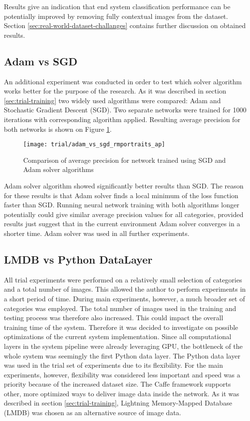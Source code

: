    Results give an indication that end system classification performance can be potentially improved by removing fully contextual images from the dataset. Section \ref{sec:real-world-dataset-challanges} contains further discussion on obtained results.

    
\subsection{Adam vs SGD}
    An additional experiment was conducted in order to test which solver algorithm works better for the purpose of the research. As it was described in section \ref{sec:trial-training} two widely used algorithms were compared: Adam and Stochastic Gradient Descent (SGD). Two separate networks were trained for 1000 iterations with corresponding algorithm applied. Resulting average precision for both networks is shown on Figure \ref{fig:trial-sgd-vs-adam}.

    \begin{figure}[H]
        \centering
        \texttt{[image: trial/adam\_vs\_sgd\_rmportraits\_ap]}
        \caption{Comparison of average precision for network trained using SGD and Adam solver algorithms}
        \label{fig:trial-sgd-vs-adam}
    \end{figure}
    
    Adam solver algorithm showed significantly better results than SGD. The reason for these results is that Adam solver finds a local minimum of the loss function faster than SGD. Running neural network training with both algorithms longer potentially could give similar average precision values for all categories, provided results just suggest that in the current environment Adam solver converges in a shorter time. Adam solver was used in all further experiments.
    
    
\subsection{LMDB vs Python DataLayer}
    All trial experiments were performed on a relatively small selection of categories and a total number of images. This allowed the author to perform experiments in a short period of time. During main experiments, however, a much broader set of categories was employed. The total number of images used in the training and testing process was therefore also increased. This could impact the overall training time of the system. Therefore it was decided to investigate on possible optimizations of the current system implementation. Since all computational layers in the system pipeline were already leveraging GPU, the bottleneck of the whole system was seemingly the first Python data layer. The Python data layer was used in the trial set of experiments due to its flexibility. For the main experiments, however, flexibility was considered less important and speed was a priority because of the increased dataset size. The Caffe framework supports other, more optimized ways to deliver image data inside the network. As it was described in section \ref{sec:trial-training}, Lightning Memory-Mapped Database (LMDB) was chosen as an alternative source of image data.
    
